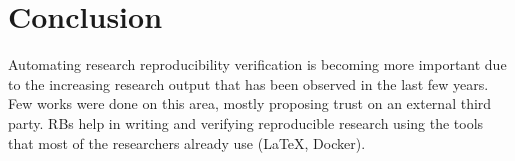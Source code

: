 \documentclass[journal]{IEEEtran}
\begin{document}
\section{Conclusion}
Automating research reproducibility verification is becoming more important due to the increasing research output that has been observed in the last few years.
Few works were done on this area, mostly proposing trust on an external third party.
RBs help in writing and verifying reproducible research using the tools that most of the researchers already use (\LaTeX, Docker).



\end{document}
